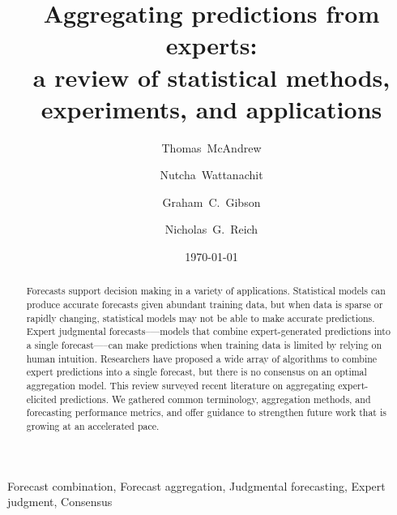 \documentclass[preprint,authoryear,nonatbib]{elsarticle}
\date{\today}
\begin{document}
   \begin{frontmatter}

     \title{Aggregating predictions from experts: \\ a review of statistical methods, experiments, and applications}

     \author[1]{Thomas~McAndrew }
     
     \author[1]{Nutcha~Wattanachit}

     \author[1]{Graham~C.~Gibson}
     
     \author[1]{Nicholas~G.~Reich}
     
     
     
      \address[1]{Department of Biostatistics and Epidemiology, School of Public Health and Health Sciences, University of Massachusetts at Amherst, Amherst, Massachusetts, USA}

\begin{abstract}
  Forecasts support decision making in a variety of applications.
  Statistical models can produce accurate forecasts given abundant training data, but when data is sparse or rapidly changing, statistical models may not be able to make accurate predictions.
  Expert judgmental forecasts--—models that combine expert-generated predictions into a single forecast—--can make predictions when training data is limited by relying on human intuition.
  Researchers have proposed a wide array of algorithms to combine expert predictions into a single forecast, but there is no consensus on an optimal aggregation model.
  This review surveyed recent literature on aggregating expert-elicited predictions.
  We gathered common terminology, aggregation methods, and forecasting performance metrics, and offer guidance to strengthen future work that is growing at an accelerated pace.
\end{abstract}

\begin{keyword}
Forecast combination, Forecast aggregation, Judgmental forecasting, Expert judgment, Consensus 
\end{keyword}

\end{frontmatter}
\end{document}
